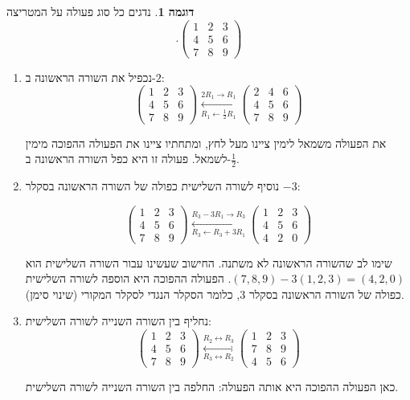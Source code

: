 \documentclass[12pt]{report}
\theoremstyle{plain}
\theoremstyle{definition}
\newtheorem{example}{דוגמה}[chapter]
\newcommand{\0}{\mathbf{0}}
\begin{document}
\begin{example}
נדגים כל סוג פעולה על המטריצה 
$$
.\begin{pmatrix}1 & 2 & 3\\
4 & 5 & 6\\
7 & 8 & 9
\end{pmatrix}
$$

\begin{enumerate}[label=\alph*.]
\item
 נכפיל את השורה הראשונה ב-$2$:
$$
\begin{pmatrix}1 & 2 & 3\\
4 & 5 & 6\\
7 & 8 & 9
\end{pmatrix}\overset{2R_1 \to R_1}{\underset{R_1\leftarrow \frac{1}{2}R_1}{\longleftrightarrow}}\begin{pmatrix}2 & 4 & 6\\
4 & 5 & 6\\
7 & 8 & 9
\end{pmatrix}
$$

את הפעולה משמאל לימין ציינו מעל לחץ, ומתחתיו ציינו את הפעולה ההפוכה
מימין לשמאל. פעולה זו היא כפל השורה הראשונה ב-$\frac{1}{2}$.

\item
 נוסיף לשורה השלישית כפולה של השורה הראשונה בסקלר
$-3$:

$$
\begin{pmatrix}1 & 2 & 3\\
4 & 5 & 6\\
7 & 8 & 9
\end{pmatrix}\overset{R_3-3R_1 \to R_3}{\underset{R_3\leftarrow R_3+3R_1}{\longleftrightarrow}}\begin{pmatrix}1 & 2 & 3\\
4 & 5 & 6\\
4 & 2 & 0
\end{pmatrix}
$$

שימו לב שהשורה הראשונה לא משתנה. החישוב שעשינו עבור השורה השלישית
הוא $(7,8,9)-3(1,2,3)=(4,2,0)$. הפעולה ההפוכה היא הוספה לשורה
השלישית כפולה של השורה הראשונה בסקלר $3$, כלומר הסקלר הנגדי לסקלר
המקורי (שינוי סימן).

\item
 נחליף בין השורה השנייה לשורה השלישית:
$$
\begin{pmatrix}1 & 2 & 3\\
4 & 5 & 6\\
7 & 8 & 9
\end{pmatrix}\overset{R_2 \leftrightarrow R_3}{\underset{R_3 \leftrightarrow R_2}{\longleftrightarrow}}\begin{pmatrix}1 & 2 & 3\\
7 & 8 & 9\\
4 & 5 & 6
\end{pmatrix}
$$

כאן הפעולה ההפוכה היא אותה הפעולה: החלפה בין השורה השנייה לשורה השלישית.
\end{enumerate}
\end{example}
\end{document}
